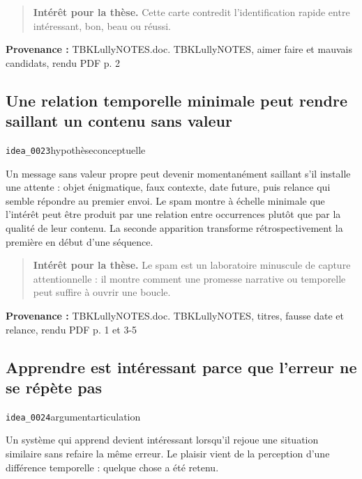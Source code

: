 \documentclass[10pt,a4paper]{article}
\begin{document}
\begin{quote}
\textbf{Intérêt pour la thèse.} Cette carte contredit l'identification rapide entre intéressant, bon, beau ou réussi.
\end{quote}
{\footnotesize\color{metadata}\textbf{Provenance :} TBKLullyNOTES.doc. TBKLullyNOTES, aimer faire et mauvais candidats, rendu PDF p. 2\par}

\subsection{Une relation temporelle minimale peut rendre saillant un contenu sans valeur}
{\small\color{metadata} \texttt{idea\_0023}\quad\textbullet\quad hypothèse\quad\textbullet\quad conceptuelle\par}

Un message sans valeur propre peut devenir momentanément saillant s'il installe une attente : objet énigmatique, faux contexte, date future, puis relance qui semble répondre au premier envoi. Le spam montre à échelle minimale que l'intérêt peut être produit par une relation entre occurrences plutôt que par la qualité de leur contenu. La seconde apparition transforme rétrospectivement la première en début d'une séquence.

\begin{quote}
\textbf{Intérêt pour la thèse.} Le spam est un laboratoire minuscule de capture attentionnelle : il montre comment une promesse narrative ou temporelle peut suffire à ouvrir une boucle.
\end{quote}
{\footnotesize\color{metadata}\textbf{Provenance :} TBKLullyNOTES.doc. TBKLullyNOTES, titres, fausse date et relance, rendu PDF p. 1 et 3-5\par}

\subsection{Apprendre est intéressant parce que l'erreur ne se répète pas}
{\small\color{metadata} \texttt{idea\_0024}\quad\textbullet\quad argument\quad\textbullet\quad articulation\par}

Un système qui apprend devient intéressant lorsqu'il rejoue une situation similaire sans refaire la même erreur. Le plaisir vient de la perception d'une différence temporelle : quelque chose a été retenu.
\end{document}
